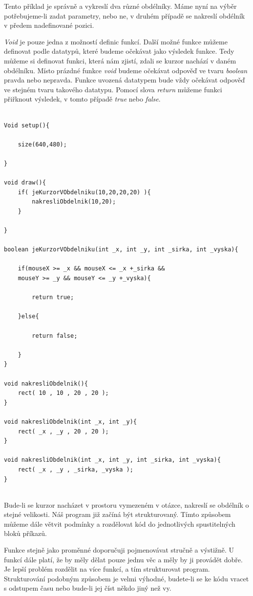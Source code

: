 \documentclass[10pt,twoside=true,open=right,cleardoublepage=empty,chapterprefix=true]{scrbook}
\newcommand{\vyraz}[1]{\textit{\gls{#1}}\index{#1}\label{#1}}
\begin{document}
Tento příklad je správně a vykreslí dva různé obdélníky. Máme nyní na výběr potřebujeme-li zadat parametry, nebo ne, v druhém případě se nakreslí obdélník v předem nadefinované pozici.


{\em Void} je pouze jedna z možností definic funkcí. Další možné funkce můžeme definovat podle datatypů, které budeme očekávat jako výsledek funkce. Tedy můžeme si definovat funkci, která nám zjistí, zdali se kurzor nachází v daném obdélníku. Místo prázdné funkce {\em void} budeme očekávat odpověď ve tvaru \vyraz{boolean} pravda nebo nepravda. Funkce uvozená datatypem bude vždy očekávat odpověď ve stejném tvaru takového datatypu. Pomocí slova \vyraz{return} můžeme funkci přiřknout výsledek, v tomto případě \vyraz{true} nebo \vyraz{false}.

\begin{lstlisting}

Void setup(){

	size(640,480);

}

void draw(){
	if( jeKurzorVObdelniku(10,20,20,20) ){
		nakresliObdelnik(10,20);
	}

}

boolean jeKurzorVObdelniku(int _x, int _y, int _sirka, int _vyska){
	
	if(mouseX >= _x && mouseX <= _x +_sirka &&
	mouseY >= _y && mouseY <= _y +_vyska){
	
		return true;
	
	}else{
	
		return false;
	
	}
}

void nakresliObdelnik(){
	rect( 10 , 10 , 20 , 20 );
}

void nakresliObdelnik(int _x, int _y){
	rect( _x , _y , 20 , 20 );
}

void nakresliObdelnik(int _x, int _y, int _sirka, int _vyska){
	rect( _x , _y , _sirka, _vyska );
}


\end{lstlisting}


Bude-li se kurzor nacházet v prostoru vymezeném v otázce, nakreslí se obdélník o stejné velikosti. Náš program již začíná být strukturovaný. Tímto způsobem můžeme dále větvit podmínky a rozdělovat kód do jednotlivých spustitelných bloků příkazů.

Funkce stejně jako proměnné doporučuji pojmenovávat stručně a výstižně. U funkcí dále platí, že by měly dělat pouze jednu věc a měly by ji provádět dobře. Je lepší problém rozdělit na více funkcí, a tím  strukturovat program. Strukturování podobným způsobem je velmi výhodné, budete-li se ke kódu vracet s odstupem času nebo bude-li jej číst někdo jiný než vy.
\end{document}
